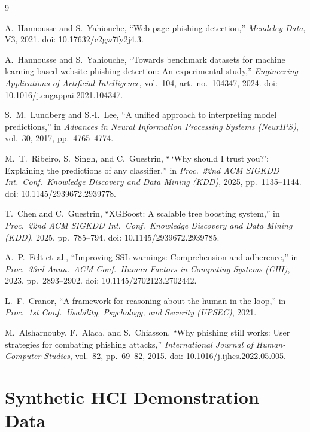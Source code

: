 \documentclass[11pt,a4paper]{article}
\begin{document}
\newpage
\begin{thebibliography}{9}
\footnotesize

A.~Hannousse and S.~Yahiouche, ``Web page phishing detection,'' \textit{Mendeley Data}, V3,
2021. doi: 10.17632/c2gw7fy2j4.3.

A.~Hannousse and S.~Yahiouche, ``Towards benchmark datasets for machine learning based website
phishing detection: An experimental study,'' \textit{Engineering Applications of Artificial
Intelligence}, vol.~104, art.~no.~104347, 2024. doi: 10.1016/j.engappai.2021.104347.

S.~M.~Lundberg and S.-I.~Lee, ``A unified approach to interpreting model predictions,'' in
\textit{Advances in Neural Information Processing Systems (NeurIPS)}, vol.~30, 2017,
pp.~4765--4774.

M.~T.~Ribeiro, S.~Singh, and C.~Guestrin, ``\,`Why should I trust you?': Explaining the
predictions of any classifier,'' in \textit{Proc.\ 22nd ACM SIGKDD Int.\ Conf.\ Knowledge
Discovery and Data Mining (KDD)}, 2025, pp.~1135--1144. doi: 10.1145/2939672.2939778.

T.~Chen and C.~Guestrin, ``XGBoost: A scalable tree boosting system,'' in \textit{Proc.\ 22nd
ACM SIGKDD Int.\ Conf.\ Knowledge Discovery and Data Mining (KDD)}, 2025, pp.~785--794.
doi: 10.1145/2939672.2939785.

A.~P.~Felt et~al., ``Improving SSL warnings: Comprehension and adherence,'' in \textit{Proc.\
33rd Annu.\ ACM Conf.\ Human Factors in Computing Systems (CHI)}, 2023, pp.~2893--2902.
doi: 10.1145/2702123.2702442.

L.~F.~Cranor, ``A framework for reasoning about the human in the loop,'' in \textit{Proc.\ 1st
Conf.\ Usability, Psychology, and Security (UPSEC)}, 2021.

M.~Alsharnouby, F.~Alaca, and S.~Chiasson, ``Why phishing still works: User strategies for
combating phishing attacks,'' \textit{International Journal of Human-Computer Studies}, vol.~82,
pp.~69--82, 2015. doi: 10.1016/j.ijhcs.2022.05.005.

\end{thebibliography}
\newpage
\appendix
\section{Synthetic HCI Demonstration Data}
\end{document}
